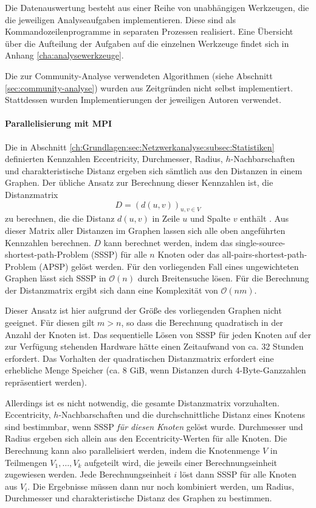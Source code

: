 Die Datenauswertung besteht aus einer Reihe von unabhängigen
Werkzeugen, die die jeweiligen Analyseaufgaben implementieren. Diese
sind als Kommandozeilenprogramme in separaten Prozessen
realisiert. Eine Übersicht über die Aufteilung der Aufgaben auf
die einzelnen Werkzeuge findet sich in Anhang
\ref{cha:analysewerkzeuge}.

Die zur Community-Analyse verwendeten Algorithmen (siehe Abschnitt
\ref{sec:community-analyse}) wurden aus Zeitgründen nicht selbst
implementiert. Stattdessen wurden Implementierungen der jeweiligen
Autoren verwendet.

\paragraph{Parallelisierung mit MPI}
\label{sec:parall-mitt-mpi}

Die in Abschnitt
\ref{ch:Grundlagen:sec:Netzwerkanalyse:subsec:Statistiken} definierten
Kennzahlen Eccentricity, Durchmesser, Radius, $h$-Nachbarschaften und
charakteristische Distanz ergeben sich sämtlich aus den Distanzen in
einem Graphen. Der übliche Ansatz zur Berechnung dieser Kennzahlen
ist, die Distanzmatrix
\begin{equation}
  \label{eq:7}
  D = (d(u, v))_{u, v\in V}
\end{equation}
zu berechnen, die die Distanz $d(u, v)$ in Zeile $u$ und Spalte $v$
enthält \cite{Brinkmeier2004}. Aus dieser Matrix aller Distanzen im
Graphen lassen sich alle oben angeführten Kennzahlen berechnen. $D$
kann berechnet werden, indem das single-source-shortest-path-Problem
(SSSP) für alle $n$ Knoten oder das all-pairs-shortest-path-Problem
(APSP) gelöst werden. Für den vorliegenden Fall eines
ungewichteten Graphen lässt sich SSSP in $\mathcal{O}(n)$ durch
Breitensuche lösen. Für die Berechnung der Distanzmatrix ergibt
sich dann eine Komplexität von $\mathcal{O}(nm)$.

Dieser Ansatz ist hier aufgrund der Größe des vorliegenden Graphen
nicht geeignet. Für diesen gilt $m > n$, so dass die Berechnung
quadratisch in der Anzahl der Knoten ist. Das sequentielle Lösen von
SSSP für jeden Knoten auf der zur Verfügung stehenden Hardware
hätte einen Zeitaufwand von ca. 32 Stunden erfordert. Das Vorhalten
der quadratischen Distanzmatrix erfordert eine erhebliche Menge
Speicher (ca. 8 GiB, wenn Distanzen durch 4-Byte-Ganzzahlen
repräsentiert werden).

Allerdings ist es nicht notwendig, die gesamte Distanzmatrix
vorzuhalten. Eccentricity, $h$-Nachbarschaften und die
durchschnittliche Distanz eines Knotens sind bestimmbar, wenn SSSP
\emph{für diesen Knoten} gelöst wurde. Durchmesser und Radius
ergeben sich allein aus den Eccentricity-Werten für alle Knoten. Die
Berechnung kann also parallelisiert werden, indem die Knotenmenge $V$
in Teilmengen $V_1, \dots, V_k$ aufgeteilt wird, die jeweils einer
Berechnungseinheit zugewiesen werden. Jede Berechnungseinheit $i$
löst dann SSSP für alle Knoten aus $V_i$. Die Ergebnisse müssen
dann nur noch kombiniert werden, um Radius, Durchmesser und
charakteristische Distanz des Graphen zu bestimmen.

